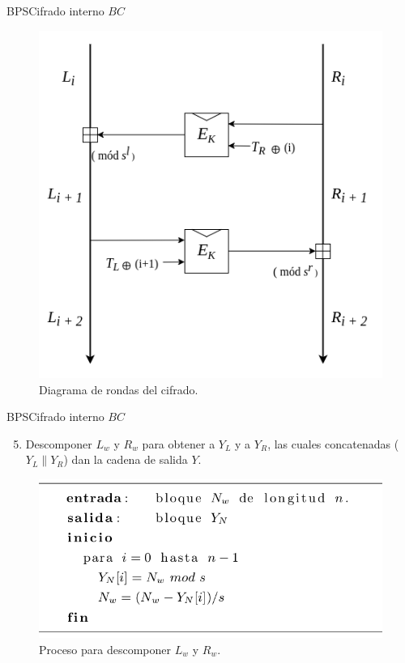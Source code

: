 \begin{frame}{BPS}{Cifrado interno $BC$}

  \begin{figure}[H]
    \begin{center}
      \includegraphics[width=0.6\linewidth]
        {../../../diagramas_comunes/bps/cifrado_bc}
      \caption{Diagrama de rondas del cifrado.}
     \end{center}
  \end{figure}

\end{frame}

\begin{frame}{BPS}{Cifrado interno $BC$}

  \begin{enumerate}
    \setcounter{enumi}{4}
    \item Descomponer $L_w$ y $R_w$ para obtener a $Y_L$ y a $Y_R$, las
      cuales concatenadas ($Y_L \parallel Y_R$) dan la cadena de salida $Y$.
  \end{enumerate}

    \begin{figure}[H]
      \begin{center}
        \includegraphics[width=0.75\linewidth]
          {../../../diagramas_comunes/bps/descomposicion}
        \caption{Proceso para descomponer $L_w$ y $R_w$.}
       \end{center}
    \end{figure}

\end{frame}

